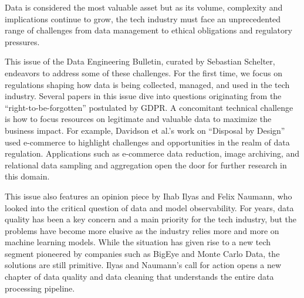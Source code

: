 \documentclass[11pt]{article}
\begin{document}
Data is considered the most valuable asset but as its volume,
complexity and implications continue to grow, the tech industry must
face an unprecedented range of challenges from data management to
ethical obligations and regulatory pressures.

This issue of the Data Engineering Bulletin, curated by Sebastian
Schelter, endeavors to address some of these challenges. For the first
time, we focus on regulations shaping how data is being collected,
managed, and used in the tech industry. Several papers in this issue
dive into questions originating from the ``right-to-be-forgotten''
postulated by GDPR. A concomitant technical challenge is how to focus
resources on legitimate and valuable data to maximize the business
impact. For example, Davidson et al.'s work on ``Disposal by Design''
used e-commerce to highlight challenges and opportunities in the realm
of data regulation. Applications such as e-commerce data reduction,
image archiving, and relational data sampling and aggregation open the
door for further research in this domain.

This issue also features an opinion piece by Ihab Ilyas and Felix
Naumann, who looked into the critical question of data and model
observability. For years, data quality has been a key concern and a
main priority for the tech industry, but the problems have become more
elusive as the industry relies more and more on machine learning
models. While the situation has given rise to a new tech segment
pioneered by companies such as BigEye and Monte Carlo Data, the
solutions are still primitive. Ilyas and Naumann's call for action
opens a new chapter of data quality and data cleaning that understands
the entire data processing pipeline.
\end{document}
